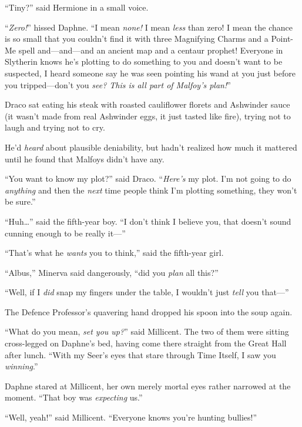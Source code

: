“Tiny?” said Hermione in a small voice.

“\emph{Zero!}” hissed Daphne. “I mean \emph{none!} I mean \emph{less} than zero! I mean the chance is so small that you couldn’t find it with three Magnifying Charms and a Point-Me spell and—and—and an ancient map and a centaur prophet! Everyone in Slytherin knows he’s plotting to do something to you and doesn’t want to be suspected, I heard someone say he was seen pointing his wand at you just before you tripped—don’t you \emph{see? This is all part of Malfoy’s plan!}”

\later

Draco sat eating his steak with roasted cauliflower florets and Ashwinder sauce (it wasn’t made from real Ashwinder eggs, it just tasted like fire), trying not to laugh and trying not to cry.

He’d \emph{heard} about plausible deniability, but hadn’t realized how much it mattered until he found that Malfoys didn’t have any.

“You want to know my plot?” said Draco. “\emph{Here’s} my plot. I’m not going to do \emph{anything} and then the \emph{next} time people think I’m plotting something, they won’t be sure.”

“Huh…” said the fifth-year boy. “I don’t think I believe you, that doesn’t sound cunning enough to be really it—”

“That’s what he \emph{wants} you to think,” said the fifth-year girl.

\later

“Albus,” Minerva said dangerously, “did you \emph{plan} all this?”

\later

“Well, if I \emph{did} snap my fingers under the table, I wouldn’t just \emph{tell} you that—”

\later

The Defence Professor’s quavering hand dropped his spoon into the soup again.

\later

“What do you mean, \emph{set you up?}” said Millicent. The two of them were sitting cross-legged on Daphne’s bed, having come there straight from the Great Hall after lunch. “With my Seer’s eyes that stare through Time Itself, I saw you \emph{winning}.”

Daphne stared at Millicent, her own merely mortal eyes rather narrowed at the moment. “That boy was \emph{expecting} us.”

“Well, yeah!” said Millicent. “Everyone knows you’re hunting bullies!”

